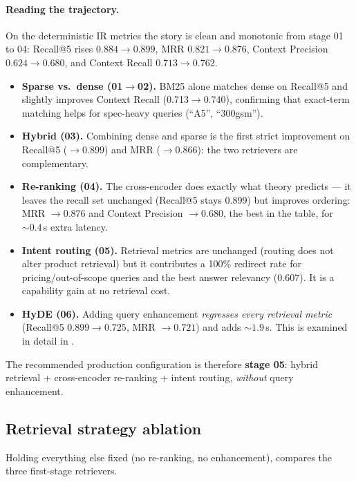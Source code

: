 \paragraph{Reading the trajectory.}
On the deterministic IR metrics the story is clean and monotonic from stage 01
to 04: Recall@5 rises $0.884\!\to\!0.899$, MRR $0.821\!\to\!0.876$, Context
Precision $0.624\!\to\!0.680$, and Context Recall $0.713\!\to\!0.762$.
\begin{itemize}[leftmargin=1.4em,itemsep=2pt]
  \item \textbf{Sparse vs.\ dense (01$\to$02).} BM25 alone matches dense on
        Recall@5 and slightly improves Context Recall (0.713$\to$0.740),
        confirming that exact-term matching helps for spec-heavy queries
        (``A5'', ``300gsm'').
  \item \textbf{Hybrid (03).} Combining dense and sparse is the first strict
        improvement on Recall@5 ($\to0.899$) and MRR ($\to0.866$): the two
        retrievers are complementary.
  \item \textbf{Re-ranking (04).} The cross-encoder does exactly what theory
        predicts \cite{nogueira2019passage} --- it leaves the recall set
        unchanged (Recall@5 stays 0.899) but improves ordering: MRR
        $\to0.876$ and Context Precision $\to0.680$, the best in the table, for
        ${\sim}0.4$\,s extra latency.
  \item \textbf{Intent routing (05).} Retrieval metrics are unchanged (routing
        does not alter product retrieval) but it contributes a 100\% redirect
        rate for pricing/out-of-scope queries and the best answer relevancy
        (0.607). It is a capability gain at no retrieval cost.
  \item \textbf{HyDE (06).} Adding query enhancement \emph{regresses every
        retrieval metric} (Recall@5 $0.899\!\to\!0.725$, MRR $\to0.721$) and adds
        ${\sim}1.9$\,s. This is examined in detail in .
\end{itemize}
The recommended production configuration is therefore \textbf{stage 05}: hybrid
retrieval + cross-encoder re-ranking + intent routing, \emph{without} query
enhancement.

\subsection{Retrieval strategy ablation}
\label{sec:retrieval}
Holding everything else fixed (no re-ranking, no enhancement),
 compares the three first-stage retrievers.

